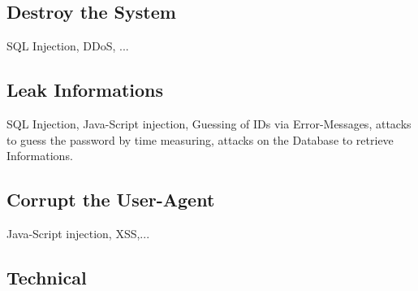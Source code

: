 \subsection{Destroy the System}
SQL Injection, DDoS, ...

\subsection{Leak Informations}
SQL Injection, Java-Script injection, Guessing of IDs via Error-Messages, 
attacks to guess the password by time measuring, attacks on the Database to retrieve Informations.

\subsection{Corrupt the User-Agent}
Java-Script injection, XSS,...

\subsection{Technical}




